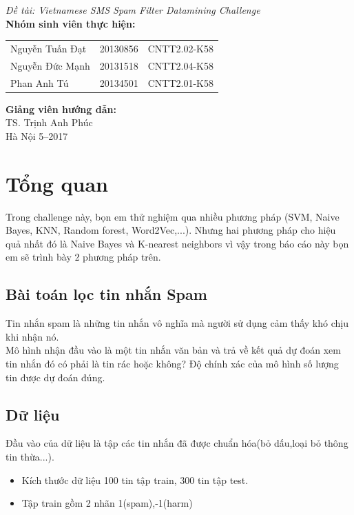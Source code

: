 \documentclass[a4paper,12pt]{report}
\renewcommand{\contentsname}{Mục lục}
\begin{document}
\begin{center}
{\fontsize{18}{20}\selectfont \emph{Đề tài:  Vietnamese SMS Spam Filter Datamining Challenge }}\\[2cm]
\hspace{-5cm}\fontsize{14}{16}\selectfont \textbf{Nhóm sinh viên thực hiện:}\\[0.1cm] 
\begin{longtable}{l c c}
Nguyễn Tuấn Đạt & 20130856 & CNTT2.02-K58 \\
Nguyễn Đức Mạnh & 20131518 & CNTT2.04-K58\\
Phan Anh Tú &   20134501 & CNTT2.01-K58\\
\end{longtable}

\hspace{-6cm}\fontsize{14}{16}\selectfont \textbf{Giảng viên hướng dẫn:}\\[0.1cm]
\hspace{-2.7cm}\fontsize{14}{16}\selectfont TS. Trịnh Anh Phúc \\[3.0cm]
\fontsize{16}{19}\selectfont Hà Nội 5--2017
\end{center}
\newpage
\pdfbookmark{\contentsname}{toc}
\tableofcontents
\listoffigures
\chapter{Tổng quan}
Trong challenge này, bọn em thử nghiệm qua nhiều phương pháp (SVM, Naive Bayes, KNN, Random forest, Word2Vec,...). Nhưng hai phương pháp cho hiệu quả nhất đó là Naive Bayes và K-nearest neighbors vì vậy trong báo cáo này bọn em sẽ trình bày 2 phương pháp trên.
\section{Bài toán lọc tin nhắn Spam}
Tin nhắn spam là những tin nhắn vô nghĩa mà người sử dụng cảm thấy khó chịu khi nhận nó. \\

Mô hình nhận đầu vào là một tin nhắn văn bản và trả về kết quả dự đoán xem tin nhắn đó có phải là tin rác hoặc không? Độ chính xác của mô hình số lượng tin được dự đoán đúng.
\section{Dữ liệu}
Đầu vào của dữ liệu là tập các tin nhắn đã được chuẩn hóa(bỏ dấu,loại bỏ thông tin thừa...). \\
\begin{itemize}
\item Kích thước dữ liệu 100 tin tập train, 300 tin tập test.
\item Tập train gồm 2 nhãn 1(spam),-1(harm)
\end{itemize}
\end{document}
